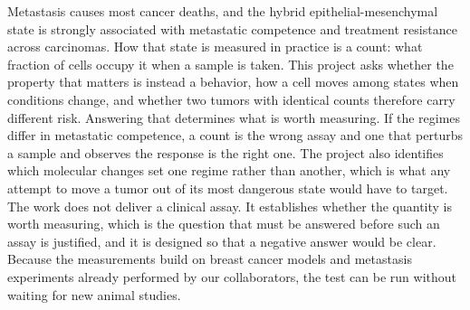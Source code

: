 Metastasis causes most cancer deaths, and the hybrid epithelial-mesenchymal state is strongly associated with metastatic competence and treatment resistance across carcinomas. How that state is measured in practice is a count: what fraction of cells occupy it when a sample is taken. This project asks whether the property that matters is instead a behavior, how a cell moves among states when conditions change, and whether two tumors with identical counts therefore carry different risk.
Answering that determines what is worth measuring. If the regimes differ in metastatic competence, a count is the wrong assay and one that perturbs a sample and observes the response is the right one. The project also identifies which molecular changes set one regime rather than another, which is what any attempt to move a tumor out of its most dangerous state would have to target.
The work does not deliver a clinical assay. It establishes whether the quantity is worth measuring, which is the question that must be answered before such an assay is justified, and it is designed so that a negative answer would be clear. Because the measurements build on breast cancer models and metastasis experiments already performed by our collaborators, the test can be run without waiting for new animal studies.